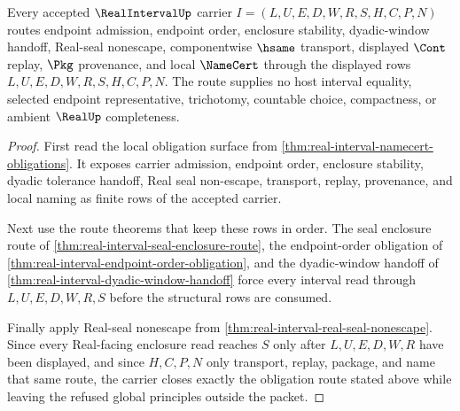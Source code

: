 \begin{theorem}
\label{thm:real-interval-obligation-closure-route}
Every accepted $\RealIntervalUp$ carrier $I=(L,U,E,D,W,R,S,H,C,P,N)$ routes endpoint admission, endpoint order, enclosure stability, dyadic-window handoff, Real-seal nonescape, componentwise $\hsame$ transport, displayed $\Cont$ replay, $\Pkg$ provenance, and local $\NameCert$ through the displayed rows $L,U,E,D,W,R,S,H,C,P,N$. The route supplies no host interval equality, selected endpoint representative, trichotomy, countable choice, compactness, or ambient $\RealUp$ completeness.
\end{theorem}
\begin{proof}
First read the local obligation surface from \autoref{thm:real-interval-namecert-obligations}. It exposes carrier admission, endpoint order, enclosure stability, dyadic tolerance handoff, Real seal non-escape, transport, replay, provenance, and local naming as finite rows of the accepted carrier.

Next use the route theorems that keep these rows in order. The seal enclosure route of \autoref{thm:real-interval-seal-enclosure-route}, the endpoint-order obligation of \autoref{thm:real-interval-endpoint-order-obligation}, and the dyadic-window handoff of \autoref{thm:real-interval-dyadic-window-handoff} force every interval read through $L,U,E,D,W,R,S$ before the structural rows are consumed.

Finally apply Real-seal nonescape from \autoref{thm:real-interval-real-seal-nonescape}. Since every Real-facing enclosure read reaches $S$ only after $L,U,E,D,W,R$ have been displayed, and since $H,C,P,N$ only transport, replay, package, and name that same route, the carrier closes exactly the obligation route stated above while leaving the refused global principles outside the packet.
\end{proof}

